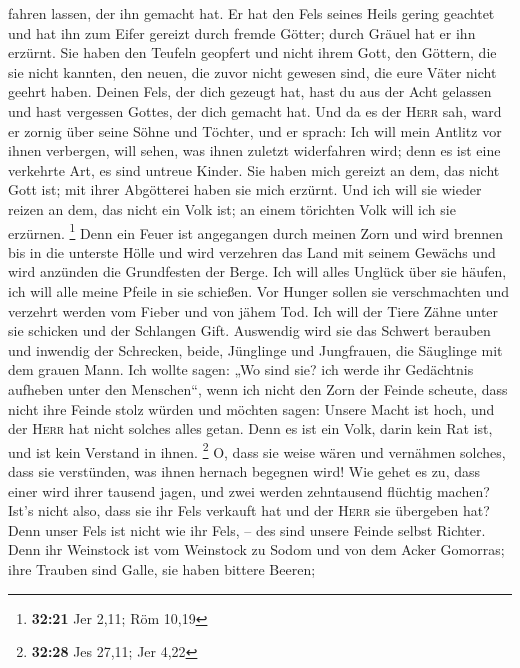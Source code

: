 fahren lassen, der ihn gemacht hat. Er hat den Fels seines Heils gering
geachtet  und hat ihn zum Eifer gereizt durch fremde
Götter; durch Gräuel hat er ihn erzürnt.  Sie haben den
Teufeln geopfert und nicht ihrem Gott, den Göttern, die sie nicht
kannten, den neuen, die zuvor nicht gewesen sind, die eure Väter nicht
geehrt haben.  Deinen Fels, der dich gezeugt hat, hast du
aus der Acht gelassen und hast vergessen Gottes, der dich gemacht hat.
 Und da es der \textsc{Herr} sah, ward er zornig über
seine Söhne und Töchter,  und er sprach: Ich will mein
Antlitz vor ihnen verbergen, will sehen, was ihnen zuletzt widerfahren
wird; denn es ist eine verkehrte Art, es sind untreue Kinder.
 Sie haben mich gereizt an dem, das nicht Gott ist; mit
ihrer Abgötterei haben sie mich erzürnt. Und ich will sie wieder reizen
an dem, das nicht ein Volk ist; an einem törichten Volk will ich sie
erzürnen. \footnote{\textbf{32:21} Jer 2,11; Röm 10,19} 
Denn ein Feuer ist angegangen durch meinen Zorn und wird brennen bis in
die unterste Hölle und wird verzehren das Land mit seinem Gewächs und
wird anzünden die Grundfesten der Berge.  Ich will alles
Unglück über sie häufen, ich will alle meine Pfeile in sie schießen.
 Vor Hunger sollen sie verschmachten und verzehrt werden
vom Fieber und von jähem Tod. Ich will der Tiere Zähne unter sie
schicken und der Schlangen Gift.  Auswendig wird sie das
Schwert berauben und inwendig der Schrecken, beide, Jünglinge und
Jungfrauen, die Säuglinge mit dem grauen Mann.  Ich
wollte sagen: „Wo sind sie? ich werde ihr Gedächtnis aufheben unter den
Menschen``,  wenn ich nicht den Zorn der Feinde scheute,
dass nicht ihre Feinde stolz würden und möchten sagen: Unsere Macht ist
hoch, und der \textsc{Herr} hat nicht solches alles getan.
 Denn es ist ein Volk, darin kein Rat ist, und ist kein
Verstand in ihnen. \footnote{\textbf{32:28} Jes 27,11; Jer 4,22}
 O, dass sie weise wären und vernähmen solches, dass sie
verstünden, was ihnen hernach begegnen wird!  Wie gehet
es zu, dass einer wird ihrer tausend jagen, und zwei werden zehntausend
flüchtig machen? Ist's nicht also, dass sie ihr Fels verkauft hat und
der \textsc{Herr} sie übergeben hat?  Denn unser Fels ist
nicht wie ihr Fels, -- des sind unsere Feinde selbst Richter.
 Denn ihr Weinstock ist vom Weinstock zu Sodom und von
dem Acker Gomorras; ihre Trauben sind Galle, sie haben bittere Beeren;
